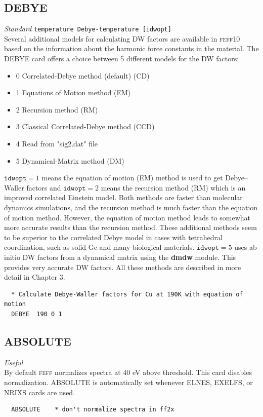 \documentclass[11pt,oneside]{report} %
\renewcommand{\htmlref}[2]{\hyperlink{#2}{#1}}
\newcommand{\program}[1]{\textsc{#1}}
\newcommand{\feff}{\program{feff}}
\newcommand{\vnum}{10}
\newcommand{\feffcur}{\feff\vnum}
\newenvironment{Card}[4]%
      {\vspace{3ex}%
        \subsection{#1}
        \quad\textsl{#3}\newline
        \quad\texttt{#2}\newline%
        \label{card:#4}\\}
      {}
\newcommand{\module}[1]{\textrm{\bf{#1}}}
\renewcommand{\htmlref}[2]{{#1}} %
\begin{document}
\begin{latexonly}
\begin{Card}{DEBYE}{temperature  Debye-temperature [idwopt]}{Standard}{deb2}
   Several additional models for
  calculating DW factors are available in {\feffcur} based on the information
  about the harmonic force constants in the material.  The \htmlref{DEBYE}{car:deb2} card offers a choice between 5 different models for the DW factors:
\begin{itemize}
				\item  0 	Correlated-Debye method  (default) (CD)
				\item  1	 Equations of Motion method (EM)
				\item  2	 Recursion method (RM)
				\item  3	 Classical Correlated-Debye method (CCD)
				\item  4	 Read from "sig2.dat" file
				\item  5	 Dynamical-Matrix method (DM)
\end{itemize}  
  $\mathtt{idwopt}=1$
  means the equation of motion (EM) method is used to get Debye--Waller
  factors and $\mathtt{idwopt}=2$ means the recursion method (RM) which
  is an improved correlated Einstein model. Both methods are faster than 
  molecular dynamics simulations, and the recursion method is much faster 
  than the equation of motion method. However, the equation of motion method 
  leads to somewhat more accurate results than the recursion method. These 
  additional methods seem to be superior to the correlated Debye model in cases 
  with tetrahedral coordination, such as solid Ge and many biological materials. 
  $\mathtt{idwopt}=5$ uses ab initio DW factors from a dynamical matrix using the \module{dmdw} module.  This provides very accurate DW factors.
  All these methods are described in more detail in \htmlref{Chapter 3}{ref:DWfactors}.

\begin{verbatim}
  * Calculate Debye-Waller factors for Cu at 190K with equation of motion
  DEBYE  190 0 1
\end{verbatim}
\end{Card}
\end{latexonly}



\begin{Card}{ABSOLUTE}{}{Useful}{abs}
  By default {\feff} normalizes spectra at 40 eV above threshold.  This card disables normalization.  ABSOLUTE is automatically
  set whenever ELNES,  EXELFS, or NRIXS cards are used.
\begin{verbatim}
  ABSOLUTE    * don't normalize spectra in ff2x
\end{verbatim}
\end{Card}
\end{document}
